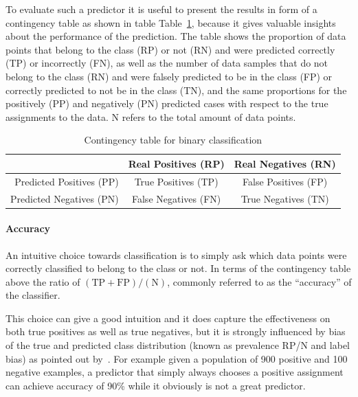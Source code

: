 To evaluate such a predictor it is useful to present the results in form of a contingency table as shown in table Table~\ref{table:contingency-table-2}, because it gives valuable insights about the performance of the prediction. The table shows the proportion of data points that belong to the class (RP) or not (RN) and were predicted correctly (TP) or incorrectly (FN), as well as the number of data samples that do not belong to the class (RN) and were falsely predicted to be in the class (FP) or correctly predicted to not be in the class (TN), and the same proportions for the positively (PP) and negatively (PN) predicted cases with respect to the true assignments to the data. N refers to the total amount of data points.

\begin{table}[h]
  \begin{center}
    \begin{tabular}{r | c c }
      & Real Positives (RP) & Real Negatives (RN) \\
      \hline
      Predicted Positives (PP) & True Positives (TP) & False Positives (FP) \\
      Predicted Negatives (PN) & False Negatives (FN) & True Negatives (TN) \\
    \end{tabular}
  \caption{Contingency table for binary classification}
\label{table:contingency-table-2}
  \end{center}
\end{table}

\paragraph{Accuracy}
\label{par:Accuracy}

An intuitive choice towards classification is to simply ask which data points were correctly classified to belong to the class or not. In terms of the contingency table above the ratio of $(\text{TP} + \text{FP}) / (\text{N})$, commonly referred to as the ``accuracy'' of the classifier.

This choice can give a good intuition and it does capture the effectiveness on both true positives as well as true negatives, but it is strongly influenced by bias of the true and predicted class distribution (known as prevalence RP/N and label bias) as pointed out by~\cite{Powers:2011aa}. For example given a population of 900 positive and 100 negative examples, a predictor that simply always chooses a positive assignment can achieve accuracy of 90\% while it obviously is not a great predictor.

